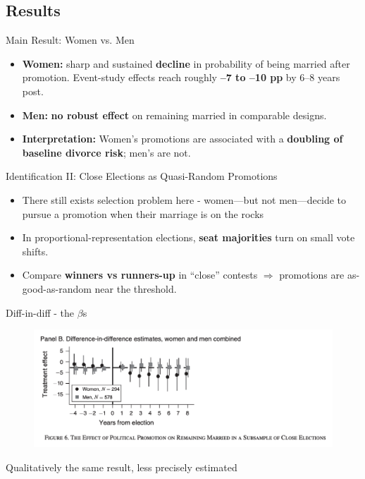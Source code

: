 \documentclass[11pt,notes=hide,aspectratio=169,mathserif]{beamer}
\begin{document}
\subsection{Results}

\begin{frame}{Main Result: Women vs. Men}
\small
\begin{itemize}
  \item \textbf{Women:} sharp and sustained \textbf{decline} in probability of being married after promotion. Event-study effects reach roughly \textbf{–7 to –10 pp} by 6–8 years post. 
  \item \textbf{Men:} \textbf{no robust effect} on remaining married in comparable designs. 
  \item \textbf{Interpretation:} Women’s promotions are associated with a \textbf{doubling of baseline divorce risk}; men’s are not. 
\end{itemize}
\end{frame}

\begin{frame}{Identification II: Close Elections as Quasi-Random Promotions}
\small
\begin{itemize}
  \item There still exists selection problem here - women—but not men—decide to pursue a promotion when their marriage is
  on the rocks
  \item In proportional-representation elections, \textbf{seat majorities} turn on small vote shifts.
  \item Compare \textbf{winners vs runners-up} in “close” contests $\Rightarrow$ promotions are as-good-as-random near the threshold.
\end{itemize}
\end{frame}

\begin{frame}{Diff-in-diff - the $\beta$s}
\small
\begin{figure}
\centering
\includegraphics[width=0.8\linewidth]{inputs/fig3.png}
\end{figure}
Qualitatively the same result, less precisely estimated
\end{frame}
\end{document}
